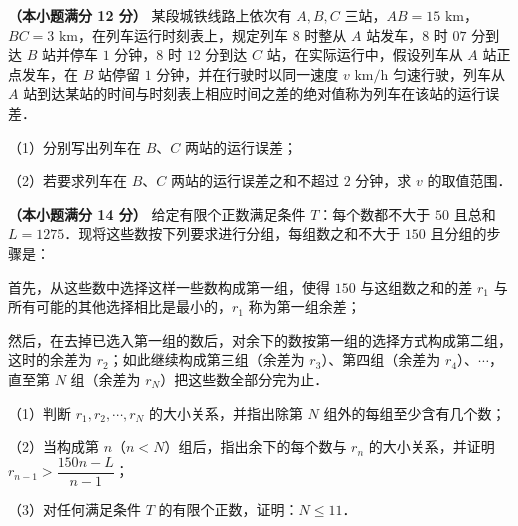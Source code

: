 \begin{question}
\textbf{（本小题满分 12 分）} 
某段城铁线路上依次有 $A, B, C$ 三站，$AB=15\text{ km}$，$BC=3\text{ km}$，在列车运行时刻表上，规定列车 $8$ 时整从 $A$ 站发车，$8$ 时 $07$ 分到达 $B$ 站并停车 $1$ 分钟，$8$ 时 $12$ 分到达 $C$ 站，在实际运行中，假设列车从 $A$ 站正点发车，在 $B$ 站停留 $1$ 分钟，并在行驶时以同一速度 $v\text{ km/h}$ 匀速行驶，列车从 $A$ 站到达某站的时间与时刻表上相应时间之差的绝对值称为列车在该站的运行误差．

（1）分别写出列车在 $B$、$C$ 两站的运行误差；

（2）若要求列车在 $B$、$C$ 两站的运行误差之和不超过 $2$ 分钟，求 $v$ 的取值范围．

\end{question}
\begin{question}
\textbf{（本小题满分 14 分）} 
给定有限个正数满足条件 $T$：每个数都不大于 $50$ 且总和 $L=1275$．现将这些数按下列要求进行分组，每组数之和不大于 $150$ 且分组的步骤是：

首先，从这些数中选择这样一些数构成第一组，使得 $150$ 与这组数之和的差 $r_1$ 与所有可能的其他选择相比是最小的，$r_1$ 称为第一组余差；

然后，在去掉已选入第一组的数后，对余下的数按第一组的选择方式构成第二组，这时的余差为 $r_2$；如此继续构成第三组（余差为 $r_3$）、第四组（余差为 $r_4$）、$\cdots$，直至第 $N$ 组（余差为 $r_N$）把这些数全部分完为止．

（1）判断 $r_1, r_2, \cdots, r_N$ 的大小关系，并指出除第 $N$ 组外的每组至少含有几个数；

（2）当构成第 $n$（$n<N$）组后，指出余下的每个数与 $r_n$ 的大小关系，并证明 $r_{n-1}>\dfrac{150n-L}{n-1}$；

（3）对任何满足条件 $T$ 的有限个正数，证明：$N\le 11$．

\end{question}
